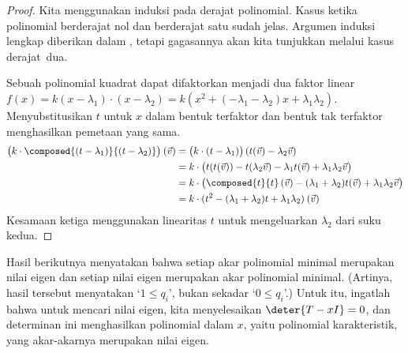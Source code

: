 \begin{proof}
Kita menggunakan induksi pada derajat polinomial.
Kasus ketika polinomial berderajat
nol dan berderajat satu sudah jelas.
Argumen induksi lengkap diberikan dalam ,
tetapi gagasannya akan kita tunjukkan melalui kasus derajat~dua.

Sebuah polinomial kuadrat dapat difaktorkan menjadi dua
faktor linear \( f(x)=k(x-\lambda_1)\cdot(x-\lambda_2)
                    =k(x^2+(-\lambda_1-\lambda_2)x+\lambda_1\lambda_2) \).
Menyubstitusikan \( t \)
untuk \( x \) dalam bentuk terfaktor dan
bentuk tak terfaktor menghasilkan pemetaan yang sama.
\begin{align*}
   \bigl(k\cdot\composed{(t-\lambda_1)}{(t-\lambda_2)}\bigr)\>(\vec{v})
   &=\bigl(k\cdot(t-\lambda_1)\bigr)\,(t(\vec{v})-\lambda_2\vec{v})    \\
   &=k\cdot\bigl(t(t(\vec{v}))-t(\lambda_2\vec{v})
      -\lambda_1 t(\vec{v})+\lambda_1\lambda_2\vec{v}\bigr)    \\
   &=k\cdot \bigl(\composed{t}{t}\,(\vec{v})-(\lambda_1+\lambda_2)t(\vec{v})
          +\lambda_1\lambda_2\vec{v}\bigr)                    \\
   &=k\cdot(t^2-(\lambda_1+\lambda_2)t+\lambda_1\lambda_2)\>(\vec{v})
\end{align*}
Kesamaan ketiga menggunakan linearitas \( t \) untuk mengeluarkan $\lambda_2$ dari
suku kedua.
\end{proof}


Hasil berikutnya menyatakan bahwa
setiap akar polinomial minimal merupakan nilai eigen dan
setiap nilai eigen merupakan akar polinomial minimal.
(Artinya, hasil tersebut menyatakan `$1\leq q_i$',
bukan sekadar `$0\leq q_i$'.)
Untuk itu, ingatlah bahwa untuk mencari nilai eigen,
kita menyelesaikan $\deter{T-xI}=0$, dan
determinan ini menghasilkan polinomial dalam $x$,
yaitu polinomial karakteristik,
yang akar-akarnya merupakan nilai eigen.

